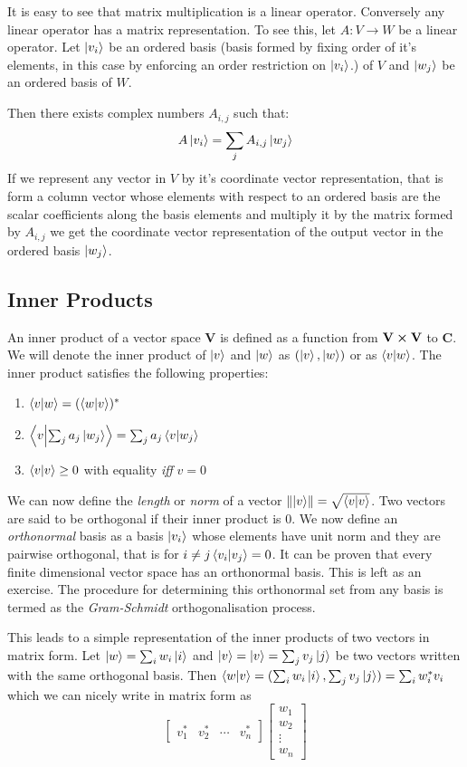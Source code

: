It is easy to see that matrix multiplication is a linear operator. Conversely any linear operator has a matrix representation. To see this, let $A: V \to W$ be a linear operator. Let $\ket{v_{i}}$ be an ordered basis (basis formed by fixing order of it's elements, in this case by enforcing an order restriction on $\ket{v_{i}}$.) of $V$ and $\ket{w_{j}}$ be an ordered basis of $W$.

Then there exists complex numbers $A_{i,j}$ such that: $$A\ket{v_{i}} = \sum_{j} A_{i,j}\ket{w_{j}}$$
If we represent any vector in $V$ by it's coordinate vector representation, that is form a column vector whose elements with respect to an ordered basis are the scalar coefficients along the basis elements  and multiply it by the matrix formed by $A_{i,j}$ we get the coordinate vector representation of the output vector in the ordered basis $\ket{w_{j}}$.

\subsection{Inner Products}
An inner product of a vector space \textbf{V} is defined as a function from $\textbf{V} \cross \textbf{V}$ to $\textbf{C}$. We will denote the inner product of $\ket{v}$ and $\ket{w}$ as $(\ket{v}, \ket{w})$ or as $\braket{v}{w}$. The inner product satisfies the following properties:
\begin{enumerate}
    \item $\braket{v}{w} = ({\braket{w}{v}})^{*}$
    \item $\braket{v}{\sum_{j} a_{j} \ket{w_{j}}} = \sum_{j} a_{j} \braket{v}{w_{j}}$
    \item $\braket{v}{v} \geq 0 $ with equality \textit{iff} $v=0$
\end{enumerate}
We can now define the \textit{length} or \textit{norm} of a vector 
$\norm{\ket{v}} = \sqrt{\braket{v}{v}}$. 
Two vectors are said to be orthogonal if their inner product is $0$. 
We now define an \textit{orthonormal} basis as a basis $\ket{v_{i}}$ whose elements have unit norm and they are pairwise orthogonal, that is for $i\neq j \braket{v_i}{v_j} = 0$.
It can be proven that every finite dimensional vector space has an orthonormal basis. This is left as an exercise. The procedure for determining this orthonormal set from any basis is termed as the \textit{Gram-Schmidt} orthogonalisation process.


This leads to a simple representation of the inner products of two vectors in matrix form. Let $\ket{w} = \sum_i w_i \ket{i}$ and $\ket{v} = \ket{v} = \sum_j v_j \ket{j} $ be two vectors written with the same orthogonal basis.
Then $\braket{w}{v} = (\sum_i w_i \ket{i}, \sum_j v_j \ket{j}) = \sum_i w_{i}^*v_i  $ which we can nicely write in matrix form as
$$ \begin{bmatrix} v_1^* & v_2^* & \cdots & v_n^* \end{bmatrix} \begin{bmatrix} w_1 \\ w_2 \\ \vdots \\ w_n \end{bmatrix}$$

